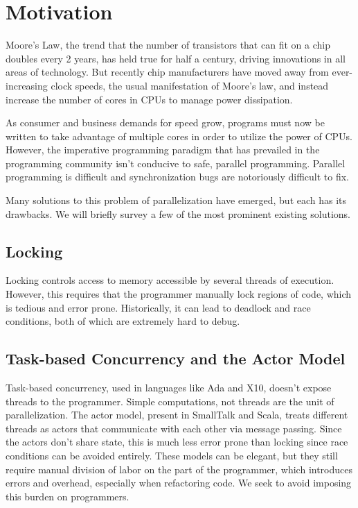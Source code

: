 \section{Motivation}
Moore's Law, the trend that the number of transistors that can fit on
a chip doubles every 2 years, has held true for half a century,
driving innovations in all areas of technology. But recently chip
manufacturers have moved away from ever-increasing clock speeds, the
usual manifestation of Moore's law, and instead increase the number of
cores in CPUs to manage power dissipation.

As consumer and business demands for speed grow, programs must now be
written to take advantage of multiple cores in order to utilize the
power of CPUs. However, the imperative programming paradigm that has
prevailed in the programming community isn't conducive to safe,
parallel programming. Parallel programming is difficult and
synchronization bugs are notoriously difficult to fix.

Many solutions to this problem of parallelization have emerged, but
each has its drawbacks. We will briefly survey a few of the most
prominent existing solutions.

\subsection{Locking}
Locking controls access to memory accessible by several threads of
execution. However, this requires that the programmer manually lock
regions of code, which is tedious and error prone.  Historically, it
can lead to deadlock and race conditions, both of which are extremely
hard to debug.

\subsection{Task-based Concurrency and the Actor Model}
Task-based concurrency, used in languages like Ada and X10, doesn't
expose threads to the programmer. Simple computations, not threads are
the unit of parallelization. The actor model, present in SmallTalk and
Scala, treats different threads as actors that communicate with each
other via message passing. Since the actors don't share state, this is
much less error prone than locking since race conditions can be
avoided entirely. These models can be elegant, but they still require
manual division of labor on the part of the programmer, which
introduces errors and overhead, especially when refactoring code. We
seek to avoid imposing this burden on programmers.

